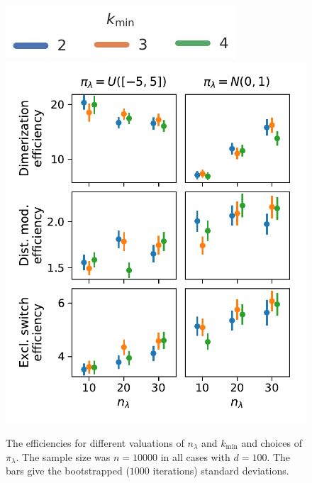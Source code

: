 \begin{figure}[htb]
    \centering
    \includegraphics[scale=.7]{gfx/legend.pdf}\\
    \includegraphics[scale=.5]{gfx/efficiency_priors.pdf}
	\caption[Estimates for varying ${n}_{\lambda}$ and ${k}_{\min}$]{The efficiencies for different valuations of ${n}_{\lambda}$ and ${k}_{\min} $
	and choices of ${\pi}_{\lambda}$. The sample size was $n=\num{10000}$ in all cases
    with $d=100$.
    The bars give the bootstrapped ($1000$ iterations) standard deviations.\label{fig:efficiencies_prior}}
\end{figure}

